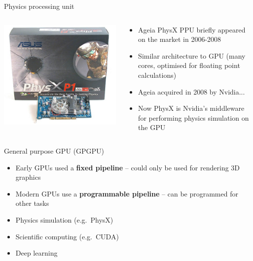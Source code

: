 \begin{frame}{Physics processing unit}
	\begin{columns}
		\begin{column}{0.35\textwidth}
			\includegraphics[width=\textwidth]{physx_ppu}
		\end{column}
		\begin{column}{0.63\textwidth}
			\begin{itemize}
				\pause \item Ageia PhysX PPU briefly appeared on the market in 2006-2008
				\pause \item Similar architecture to GPU (many cores, optimised for floating point calculations)
				\pause \item Ageia acquired in 2008 by Nvidia...
				\pause \item Now PhysX is Nvidia's middleware for performing physics simulation on the GPU
			\end{itemize}
		\end{column}
	\end{columns}
\end{frame}

\begin{frame}{General purpose GPU (GPGPU)}
	\begin{itemize}
		\pause \item Early GPUs used a \textbf{fixed pipeline} -- could only be used for rendering 3D graphics
		\pause \item Modern GPUs use a \textbf{programmable pipeline} -- can be programmed for other tasks
		\pause \item Physics simulation (e.g.\ PhysX)
		\pause \item Scientific computing (e.g.\ CUDA)
		\pause \item Deep learning
	\end{itemize}
\end{frame}

